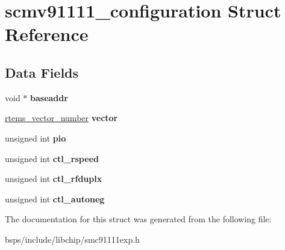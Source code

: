 \hypertarget{structscmv91111__configuration}{}\section{scmv91111\+\_\+configuration Struct Reference}
\label{structscmv91111__configuration}
\subsection*{Data Fields}
\begin{DoxyCompactItemize}
\item 
\mbox{\label{structscmv91111__configuration_af278426d694d859a42f369547c510c8c}} 
void $\ast$ {\bfseries baseaddr}
\item 
\mbox{\label{structscmv91111__configuration_a9aa47ab70eebca8ff7554e838a13941c}} 
\mbox{\hyperlink{group__ClassicINTR_ga3e434c197d99f128e78cae4d9358bd8b}{rtems\+\_\+vector\+\_\+number}} {\bfseries vector}
\item 
\mbox{\label{structscmv91111__configuration_a026157e532f8c6a8a45a955bbbafef50}} 
unsigned int {\bfseries pio}
\item 
\mbox{\label{structscmv91111__configuration_a19673f0826827903b5bd92af7ac27c1a}} 
unsigned int {\bfseries ctl\+\_\+rspeed}
\item 
\mbox{\label{structscmv91111__configuration_aea9ca48d436ae02f0f18b06f923d39ef}} 
unsigned int {\bfseries ctl\+\_\+rfduplx}
\item 
\mbox{\label{structscmv91111__configuration_a8b18a7592d82f7dfc0935840b901b8eb}} 
unsigned int {\bfseries ctl\+\_\+autoneg}
\end{DoxyCompactItemize}


The documentation for this struct was generated from the following file\+:\begin{DoxyCompactItemize}
\item 
bsps/include/libchip/smc91111exp.\+h\end{DoxyCompactItemize}
